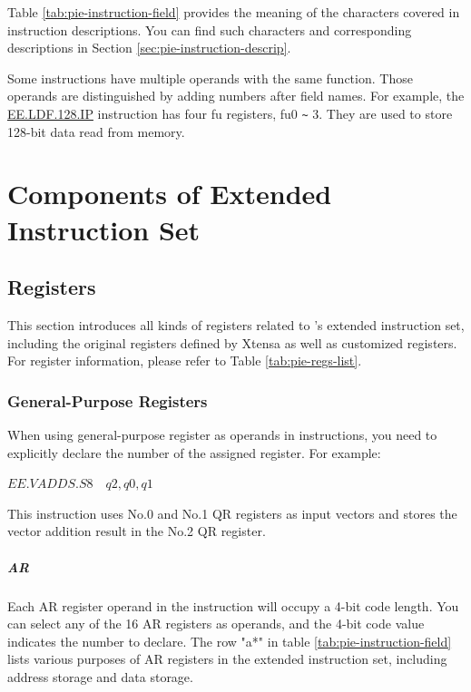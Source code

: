 \documentclass[main\_\_EN.tex]{subfiles}
\begin{document}
Table \ref{tab:pie-instruction-field} provides the meaning of the characters covered in instruction descriptions. You can find such characters and corresponding descriptions in Section \ref{sec:pie-instruction-descrip}.

\clearpage


Some instructions have multiple operands with the same function. Those operands are distinguished by adding numbers after field names. For example, the \hyperref[instruction:EELDF128IP]{EE.LDF.128.IP} instruction has four fu registers, fu0 \verb+~+ 3. They are used to store 128-bit data read from memory.

\section{Components of Extended Instruction Set}

\subsection{Registers}


This section introduces all kinds of registers related to \chipname{}'s extended instruction set, including the original registers defined by Xtensa as well as customized registers. For register information, please refer to Table \ref{tab:pie-regs-list}.



\subsubsection{General-Purpose Registers}

When using general-purpose register as operands in instructions, you need to explicitly declare the number of the assigned register. For example:

\begin{center}
$\hyperref[instruction:EEVADDSS8]{EE.VADDS.S8} \hspace{1em} q2, q0, q1$
\end{center}

This instruction uses No.0 and No.1 QR registers as input vectors and stores the vector addition result in the No.2 QR register.

\subparagraph{AR}

Each AR register operand in the instruction will occupy a 4-bit code length. You can select any of the 16 AR registers as operands, and the 4-bit code value indicates the number to declare. The row "a*" in table \ref{tab:pie-instruction-field} lists various purposes of AR registers in the extended instruction set, including address storage and data storage.
\end{document}
